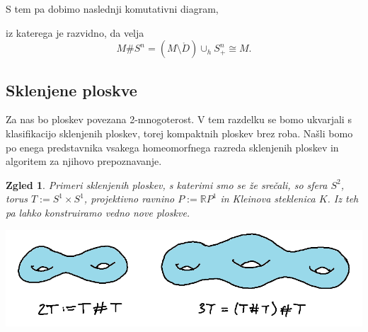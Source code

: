 \documentclass[10pt, a4paper]{article}
\newtheorem{zgled}{Zgled}[section]
\newcommand{\R}{\mathbb {R}}
\begin{document}
  \begin{center}
  \end{center}   
S tem pa dobimo naslednji komutativni diagram,
  \begin{center}
  \end{center}   
iz katerega je razvidno, da velja 
$$M \# S^n = (M \setminus \mathring{D}) \cup_h S_+^n \cong M.$$

\subsection{Sklenjene ploskve}

Za nas bo ploskev povezana 2-mnogoterost.
V tem razdelku se bomo ukvarjali s klasifikacijo sklenjenih ploskev,
torej kompaktnih ploskev brez roba.
Našli bomo po enega predstavnika vsakega homeomorfnega razreda 
sklenjenih ploskev in algoritem za njihovo prepoznavanje.

\begin{zgled}
  Primeri sklenjenih ploskev, s katerimi smo se že srečali,
  so sfera $S^2$, torus $T := S^1 \times S^1$, projektivno ravnino 
  $P := \R P^1$ in Kleinova steklenica $K$.
  Iz teh pa lahko konstruiramo vedno nove ploskve.
  \begin{center}
    \includegraphics[scale=0.7]{zgled13.png}
  \end{center}
\end{zgled}
\end{document}
